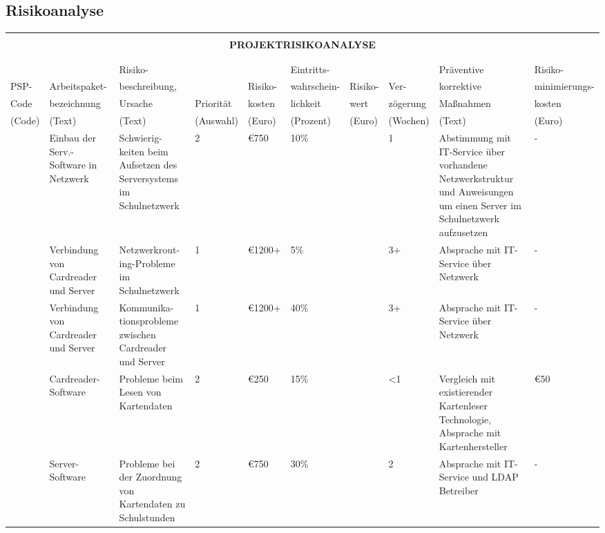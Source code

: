 \subsection{Risikoanalyse}
\begingroup
\renewcommand*{\arraystretch}{1.1} %
\begin{center}
\begin{tiny}
\begin{tabularx}{\textwidth}{|l|p{1.1cm}|X|l|l|l|p{0.5cm}|l|X|l|}
    \hline
    \multicolumn{10}{|c|}{\vspace{-0.02cm} \rowcolor{gray}} \\
    \multicolumn{10}{|c|}{\rowcolor{gray} \bfseries \normalsize \color{white} PROJEKTRISIKOANALYSE \vspace{-0.05cm}} \\
    \multicolumn{10}{|c|}{\rowcolor{gray}} \\
    \hline
    & & & & & & & & &\\
    & & Risiko- & & & Eintritts- & & & Präventive & Risiko-\\
    PSP- & Arbeitspaket- & beschreibung, & & Risiko- & wahrschein- & Risiko- & Ver- & korrektive & minimierungs- \\
    Code & bezeichnung & Ursache & Priorität & kosten & lichkeit & wert & zögerung & Maßnahmen & kosten \\
    \hline 
    (Code) & (Text) & (Text) & (Auswahl) & (Euro) & (Prozent) & (Euro) & (Wochen) & (Text) & (Euro) \\
    \hline
    [0303] & Einbau der Serv.-Software in Netzwerk & Schwierig- keiten beim Aufsetzen des Serversystems im Schulnetzwerk & 2 & €750 & 10\% & & 1 & Abstimmung mit IT-Service über vorhandene Netzwerkstruktur und Anweisungen um einen Server im Schulnetzwerk aufzusetzen &-\\
    \hline
    [0305]& Verbindung von Cardreader und Server & Netzwerkrout- ing-Probleme im Schulnetzwerk & 1 & €1200+ & 5\% & & 3+ & Absprache mit IT-Service über Netzwerk & -\\
    \hline
    [0305]& Verbindung von Cardreader und Server & Kommunika- tionsprobleme zwischen Cardreader und Server & 1 & €1200+ & 40\% & & 3+ & Absprache mit IT-Service über Netzwerk & -\\
    \hline
    [0301]& Cardreader-Software & Probleme beim Lesen von Kartendaten & 2 & €250 & 15\% & & <1 & Vergleich mit existierender Kartenleser Technologie, Absprache mit Kartenhersteller & €50\\
    \hline
    [0302]& Server-Software & Probleme bei der Zuordnung von Kartendaten zu Schulstunden & 2 & €750 & 30\% & & 2 & Absprache mit IT-Service und LDAP Betreiber & -\\

\end{tabularx}
\end{tiny}
\end{center}
